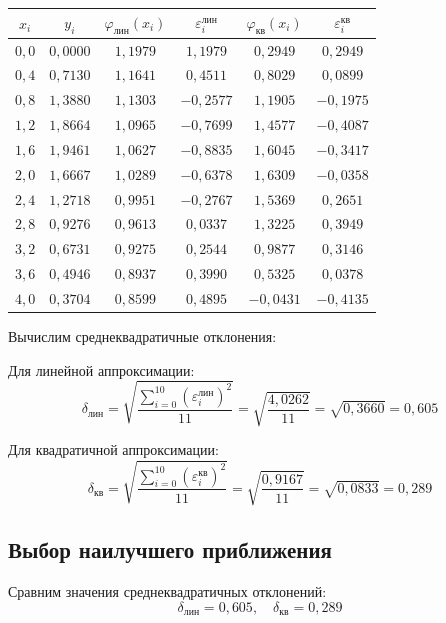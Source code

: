 \begin{table}[h!]
\centering
\label{tab:compare}
\renewcommand{\arraystretch}{1.5}
\begin{tabular}{|c|c|c|c|c|c|}
\hline
$x_i$ & $y_i$ & $\varphi_{\text{лин}}(x_i)$ & $\varepsilon_i^{\text{лин}}$ & $\varphi_{\text{кв}}(x_i)$ & $\varepsilon_i^{\text{кв}}$ \\
\hline
$0{,}0$ & $0{,}0000$ & $1{,}1979$ & $1{,}1979$ & $0{,}2949$ & $0{,}2949$ \\
$0{,}4$ & $0{,}7130$ & $1{,}1641$ & $0{,}4511$ & $0{,}8029$ & $0{,}0899$ \\
$0{,}8$ & $1{,}3880$ & $1{,}1303$ & $-0{,}2577$ & $1{,}1905$ & $-0{,}1975$ \\
$1{,}2$ & $1{,}8664$ & $1{,}0965$ & $-0{,}7699$ & $1{,}4577$ & $-0{,}4087$ \\
$1{,}6$ & $1{,}9461$ & $1{,}0627$ & $-0{,}8835$ & $1{,}6045$ & $-0{,}3417$ \\
$2{,}0$ & $1{,}6667$ & $1{,}0289$ & $-0{,}6378$ & $1{,}6309$ & $-0{,}0358$ \\
$2{,}4$ & $1{,}2718$ & $0{,}9951$ & $-0{,}2767$ & $1{,}5369$ & $0{,}2651$ \\
$2{,}8$ & $0{,}9276$ & $0{,}9613$ & $0{,}0337$ & $1{,}3225$ & $0{,}3949$ \\
$3{,}2$ & $0{,}6731$ & $0{,}9275$ & $0{,}2544$ & $0{,}9877$ & $0{,}3146$ \\
$3{,}6$ & $0{,}4946$ & $0{,}8937$ & $0{,}3990$ & $0{,}5325$ & $0{,}0378$ \\
$4{,}0$ & $0{,}3704$ & $0{,}8599$ & $0{,}4895$ & $-0{,}0431$ & $-0{,}4135$ \\
\hline
\end{tabular}
\end{table}

Вычислим среднеквадратичные отклонения:

Для линейной аппроксимации:
\[
\delta_{\text{лин}} = \sqrt{\frac{\sum_{i=0}^{10} (\varepsilon_i^{\text{лин}})^2}{11}} = \sqrt{\frac{4{,}0262}{11}} = \sqrt{0{,}3660} = 0{,}605
\]

Для квадратичной аппроксимации:
\[
\delta_{\text{кв}} = \sqrt{\frac{\sum_{i=0}^{10} (\varepsilon_i^{\text{кв}})^2}{11}} = \sqrt{\frac{0{,}9167}{11}} = \sqrt{0{,}0833} = 0{,}289
\]

\subsection{Выбор наилучшего приближения}

Сравним значения среднеквадратичных отклонений:
\[
\delta_{\text{лин}} = 0{,}605,\quad \delta_{\text{кв}} = 0{,}289
\]

